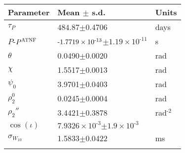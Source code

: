 \begin{tabular}{lll} \hhline{===}
        Parameter & Mean $\pm$ s.d. &  Units\\ \hline
$\tau_{P}$ & $484.87$$\pm$0.4706 & days\\
$P$\textrm{-}$P^{\tiny\textrm{ATNF}}$
 & ${\text{\textrm{-}}1.7719}\times 10^{\textrm{-}13}$$\pm$${1.19}\times 10^{\textrm{-}11}$ & s\\
$\theta$ & 0.0490$\pm$0.0020 & rad\\
$\chi$ & 1.5517$\pm$0.0013 & rad\\
$\psi_0$ & 3.9701$\pm$0.0403 & rad\\
$\rho_{2}^{0}$ & 0.0245$\pm$0.0004 & rad\\
$\rho_{2}''$ & 3.4421$\pm$0.3878 & rad$^{\textrm{-}2}$\\
$\cos(\iota)$ & ${7.9326}\times 10^{\textrm{-}3}$$\pm$${1.9}\times 10^{\textrm{-}3}$ & \\
$\sigma_{W_{10}}$ & 1.5833$\pm$0.0422 & ms\\
\hhline{===}
\end{tabular}